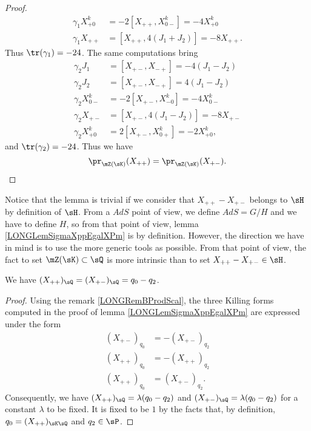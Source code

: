 \begin{proof}
\begin{subequations}
\begin{align}
			\gamma_1X^k_{+0}&=-2[X_{++},X^k_{0-}]=-4X^k_{+0} \\
			\gamma_1X_{++}&=[X_{++},4(J_1+J_2)]=-8X_{++}.
		\end{align}
	\end{subequations}
	Thus $\tr(\gamma_1)=-24$. The same computations bring
	\begin{subequations}
		\begin{align}
			\gamma_2J_1&=[X_{+-},X_{-+}]=-4(J_1-J_2)\\
			\gamma_2J_2&=[X_{+-},X_{-+}]=4(J_1-J_2)\\
			\gamma_2X^k_{0-}&=-2[X_{+-},X^k_{-0}]=-4X^k_{0-}\\
			\gamma_2X_{+-}&=[X_{+-},4(J_1-J_2)]=-8X_{+-}\\
			\gamma_2X^k_{+0}&=2[X_{+-},X^k_{0+}]=-2X^k_{+0},
		\end{align}
	\end{subequations}
	and $\tr(\gamma_2)=-24$. Thus we have 
	\begin{equation}
		\pr_{\mZ(\sK)}(X_{++})=\pr_{\mZ(\sK)}(X_{+-}).
	\end{equation}
\end{proof}

Notice that the lemma is trivial if we consider that $X_{++}-X_{+-}$ belongs to $\sH$ by definition of $\sH$. From a $AdS$ point of view, we define $AdS=G/H$ and we have to define $H$, so from that point of view, lemma \ref{LONGLemSigmaXppEgalXPm} is by definition. However, the direction we have in mind is to use the more generic tools as possible. From that point of view, the fact to set $\mZ(\sK)\subset\sQ$ is more intrinsic than to set $X_{++}-X_{+-}\in\sH$.


\begin{proposition}		\label{LONGPropXmpXppqq}
	We have $(X_{++})_{\sQ}=(X_{+-})_{\sQ}=q_0-q_2$.
\end{proposition}

\begin{proof}
	Using the remark \ref{LONGRemBProdScal}, the three Killing forms computed in the proof of lemma \ref{LONGLemSigmaXppEgalXPm} are expressed under the form
	\begin{subequations}
		\begin{align}
			(X_{+-})_{q_0}&=-(X_{+-})_{q_2}\\
			(X_{++})_{q_0}&=-(X_{++})_{q_2}\\
			(X_{++})_{q_0}&=(X_{+-})_{q_2}.
		\end{align}
	\end{subequations}
	Consequently, we have $(X_{++})_{\sQ}=\lambda(q_0-q_2)$ and $(X_{+-})_{\sQ}=\lambda(q_0-q_2)$ for a constant $\lambda$ to be fixed. It is fixed to be $1$ by the facts that, by definition, $q_0=(X_{++})_{\sK\sQ}$ and $q_2\in\sP$.
\end{proof}

